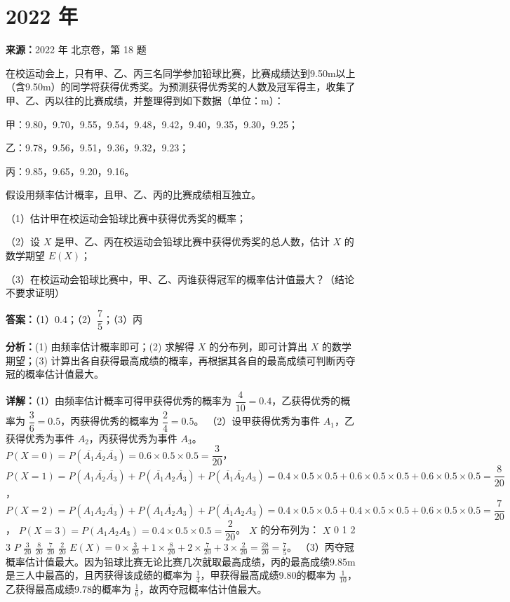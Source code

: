\section*{2022 年}

\begin{question}[points=13]
\textbf{来源：}2022 年 北京卷，第 18 题\par
在校运动会上，只有甲、乙、丙三名同学参加铅球比赛，比赛成绩达到9.50m以上（含9.50m）的同学将获得优秀奖。为预测获得优秀奖的人数及冠军得主，收集了甲、乙、丙以往的比赛成绩，并整理得到如下数据（单位：m）：

甲：9.80，9.70，9.55，9.54，9.48，9.42，9.40，9.35，9.30，9.25；

乙：9.78，9.56，9.51，9.36，9.32，9.23；

丙：9.85，9.65，9.20，9.16。

假设用频率估计概率，且甲、乙、丙的比赛成绩相互独立。

（1）估计甲在校运动会铅球比赛中获得优秀奖的概率；

（2）设 $X$ 是甲、乙、丙在校运动会铅球比赛中获得优秀奖的总人数，估计 $X$ 的数学期望 $E(X)$；

（3）在校运动会铅球比赛中，甲、乙、丙谁获得冠军的概率估计值最大？（结论不要求证明）
\begin{solution}
\textbf{答案：}（1）0.4；（2）$\dfrac{7}{5}$；（3）丙

\textbf{分析：}(1) 由频率估计概率即可；(2) 求解得 $X$ 的分布列，即可计算出 $X$ 的数学期望；(3) 计算出各自获得最高成绩的概率，再根据其各自的最高成绩可判断丙夺冠的概率估计值最大。

\textbf{详解：}（1）由频率估计概率可得甲获得优秀的概率为 $\dfrac{4}{10}=0.4$，乙获得优秀的概率为 $\dfrac{3}{6}=0.5$，丙获得优秀的概率为 $\dfrac{2}{4}=0.5$。
（2）设甲获得优秀为事件 $A_1$，乙获得优秀为事件 $A_2$，丙获得优秀为事件 $A_3$。
$P(X=0) = P(\overline{A_1}\overline{A_2}\overline{A_3}) = 0.6\times 0.5\times 0.5 = \dfrac{3}{20}$，
$P(X=1) = P(A_1\overline{A_2}\overline{A_3}) + P(\overline{A_1}A_2\overline{A_3}) + P(\overline{A_1}\overline{A_2}A_3) = 0.4\times0.5\times0.5 + 0.6\times0.5\times0.5 + 0.6\times0.5\times0.5 = \dfrac{8}{20}$，
$P(X=2) = P(A_1A_2\overline{A_3}) + P(A_1\overline{A_2}A_3) + P(\overline{A_1}A_2A_3) = 0.4\times0.5\times0.5 + 0.4\times0.5\times0.5 + 0.6\times0.5\times0.5 = \dfrac{7}{20}$，
$P(X=3) = P(A_1A_2A_3) = 0.4\times0.5\times0.5 = \dfrac{2}{20}$。
$X$ 的分布列为：
$X$ 0 1 2 3
$P$ $\frac{3}{20}$ $\frac{8}{20}$ $\frac{7}{20}$ $\frac{2}{20}$
$E(X) = 0\times\frac{3}{20} + 1\times\frac{8}{20} + 2\times\frac{7}{20} + 3\times\frac{2}{20} = \frac{28}{20} = \frac{7}{5}$。
（3）丙夺冠概率估计值最大。因为铅球比赛无论比赛几次就取最高成绩，丙的最高成绩9.85m是三人中最高的，且丙获得该成绩的概率为 $\frac{1}{4}$，甲获得最高成绩9.80的概率为 $\frac{1}{10}$，乙获得最高成绩9.78的概率为 $\frac{1}{6}$，故丙夺冠概率估计值最大。
\end{solution}
\end{question}

